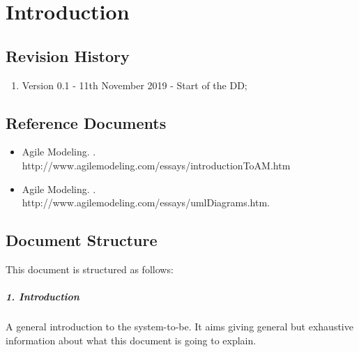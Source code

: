 \documentclass[../DD.tex]{subfiles}
\begin{document}
\chapter{Introduction}
\thispagestyle{fancy}
		
		
		
		
		\section{Revision History}
		\begin{enumerate}
			\item Version 0.1 - 11th November 2019 - Start of the DD;
			
			
		\end{enumerate}
		\section{Reference Documents}
		\begin{itemize}
			\item Agile Modeling. . \\ http://www.agilemodeling.com/essays/introductionToAM.htm
			\item Agile Modeling. . \\ http://www.agilemodeling.com/essays/umlDiagrams.htm.
		\end{itemize}
		\section{Document Structure}
		This document is structured as follows:
		\paragraph{1. Introduction}
		A general introduction to the system-to-be. It aims giving general but exhaustive information about what this document is going to explain.
\end{document}
